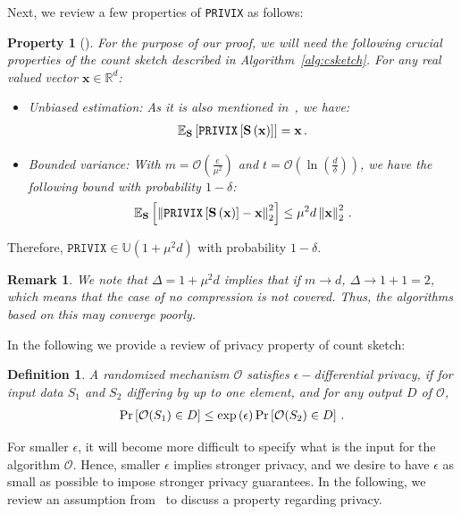 \documentclass[twoside]{article}
\newtheorem{remark}{Remark}
\newtheorem{property}{Property}
\newtheorem{definition}{Definition}
\begin{document}
Next, we review a few properties of \texttt{PRIVIX} as follows: 

\begin{property}[\cite{li2019privacy}]
For the purpose of our proof, we will need the following crucial properties of the count sketch described in Algorithm~\ref{alg:csketch}.
For any real valued vector $\mathbf{x}\in \mathbb{R}^{d}$:
\begin{itemize}
    \item[1)] \emph{Unbiased estimation}: As it is also mentioned in~\cite{li2019privacy}, we have:
    \begin{align}\notag
        \mathbb{E}_{\mathbf{S}}\left[\texttt{PRIVIX}\left[\mathbf{S}\left(\mathbf{x}\right)\right]\right]=\mathbf{x}\, .
    \end{align}
    \item[2)] \emph{Bounded variance}: With $m=\mathcal{O}\left(\frac{e}{\mu^2}\right)$ and $t=\mathcal{O}\left(\ln \left(\frac{d}{\delta}\right)\right)$, we have the following bound with probability $1-\delta$:
    \begin{align}\notag
        \mathbb{E}_{\mathbf{S}}\left[\left\|\texttt{PRIVIX}\left[\mathbf{S}\left(\mathbf{x}\right)\right]-\mathbf{x}\right\|_2^2\right]\leq \mu^2 d\left\|\mathbf{x}\right\|_2^2\, .
    \end{align}
\end{itemize}
\end{property}
Therefore, $\texttt{PRIVIX}\in \mathbb{U}(1+\mu^2 d)$ with probability $1-\delta$.
\begin{remark}
We note that $\Delta=1+\mu^2d$ implies that if $m\rightarrow d$, $\Delta\rightarrow 1+1=2$, which means that the case of no compression is not covered. Thus, the algorithms based on this may converge poorly.
\end{remark}
In the following we provide a review of privacy property of count sketch:


\begin{definition}
A randomized mechanism $\mathcal{O}$ satisfies $\epsilon-$differential privacy, if for input data ${S}_1$ and ${S}_2$ differing by up to one element, and for any output $D$ of $\mathcal{O}$,
\begin{align}\notag
    \Pr\left[\mathcal{O}(S_1)\in D\right]\leq \exp{\left(\epsilon\right)}\Pr\left[\mathcal{O}(S_2)\in D\right] \, .
\end{align}
\end{definition}
 For smaller $\epsilon$, it will become more difficult to specify what is the input for the algorithm $\mathcal{O}$. Hence, smaller $\epsilon$ implies stronger privacy, and we desire to have $\epsilon$ as small as possible to impose stronger privacy guarantees. In the following, we review an assumption from~\cite{li2019privacy} to discuss a property regarding privacy.
\end{document}
